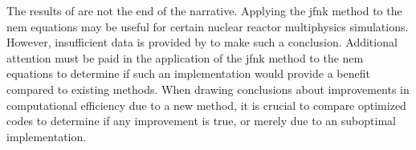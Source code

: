   The results of \citeauthor{caslJFNK} are not the end of the narrative. 
  Applying the \gls{jfnk} method to the \gls{nem} equations may be useful for
  certain nuclear reactor multiphysics simulations. However, insufficient data 
  is provided by \citeauthor{qe2paper} to make such a conclusion. Additional
  attention must be paid in the application of the \gls{jfnk} method to the
  \gls{nem} equations to determine if such an implementation would provide
  a benefit compared to existing methods. When drawing conclusions about
  improvements in computational efficiency due to a new method, it is crucial to 
  compare optimized codes to determine if any improvement is true, or merely due
  to an suboptimal implementation.
